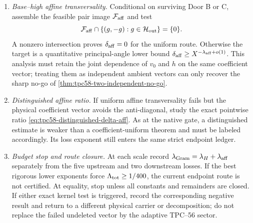 \begin{enumerate}[label=\textbf{Door \Alph*.},leftmargin=3.8em]
       This door is closed for the endpoint if literal examples force
       \(\delta_H\) to decay faster than the residual endpoint slack.  Such a
       result would be a genuine negative theorem about this route, not a
       claim of cancellation for unrelated coefficient families.

 \item \emph{Base--high affine transversality.}
       Conditional on surviving Door B or C, assemble the feasible pair image
       \(\mathcal F_{\rm aff}\) and test
       \begin{equation}
        \mathcal F_{\rm aff}\cap\{(g,-g):g\in\mathcal H_{\rm out}\}=\{0\}.
        \label{eq:tpc58-next-affine-kill-test}
       \end{equation}
       A nonzero intersection proves \(\delta_{\rm aff}=0\) for the uniform
       route.  Otherwise the target is a quantitative principal-angle lower
       bound
       \(\delta_{\rm aff}\ge X^{-\lambda_{\rm aff}+o(1)}\).  This analysis
       must retain the joint dependence of \(v_0\) and \(h\) on the same
       coefficient vector; treating them as independent ambient vectors can
       only recover the sharp no-go of
       \cref{thm:tpc58-two-independent-no-go}.

 \item \emph{Distinguished affine ratio.}
       If uniform affine transversality fails but the physical coefficient
       vector avoids the anti-diagonal, study the exact pointwise ratio
       \eqref{eq:tpc58-distinguished-delta-aff}.  As at the native gate, a
       distinguished estimate is weaker than a coefficient-uniform theorem
       and must be labeled accordingly.  Its loss exponent still enters the
       same strict endpoint ledger.

 \item \emph{Budget stop and route closure.}
       At each scale record
       \(\lambda_{\rm Gram}=\lambda_H+\lambda_{\rm aff}\) separately from
       the five upstream and two downstream losses.  If the best rigorous
       lower exponents force
       \(\Lambda_{\rm tot}\ge1/400\), the current endpoint route is not
       certified.  At equality, stop unless all constants and remainders are
       closed.  If either exact kernel test is triggered, record the
       corresponding negative result and return to a different physical
       carrier or decomposition; do not replace the failed undeleted vector
       by the adaptive TPC--56 sector.
\end{enumerate}

